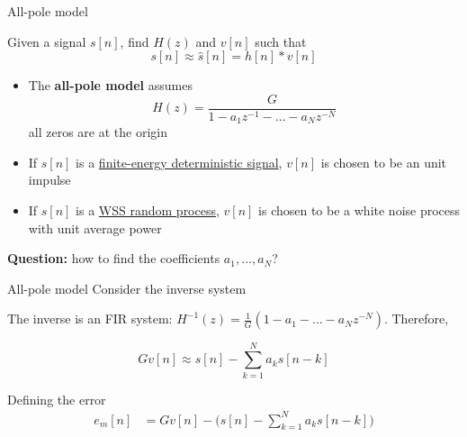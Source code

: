 \documentclass[10pt, aspectratio=169]{beamer}
\begin{document}
\begin{frame}{All-pole model}
	\begin{center}
	\resizebox{0.5\linewidth}{!}{}
	\end{center}
	
	Given a signal $s[n]$, find $H(z)$ and $v[n]$ such that 
	\begin{equation*}
		s[n] \approx \hat{s}[n] = h[n] \ast v[n]
	\end{equation*}
	
	\begin{itemize}
		\item The \textbf{all-pole model} assumes
		\begin{equation*}
			H(z) = \frac{G}{1 - a_1z^{-1} - \ldots - a_{N}z^{-N}}
		\end{equation*}
		all zeros are at the origin
		\item If $s[n]$ is a \underline{finite-energy deterministic signal}, $v[n]$ is chosen to be an unit impulse
		\item If $s[n]$ is a \underline{WSS random process}, $v[n]$ is chosen to be a white noise process with unit average power
	\end{itemize}

	\textbf{Question:} how to find the coefficients $a_1, \ldots, a_N$?
\end{frame}


\begin{frame}{All-pole model}
Consider the inverse system
\begin{center}
	\def\INVERSE{1}
	\resizebox{0.9\linewidth}{!}{}
\end{center}

The inverse is an FIR system: $H^{-1}(z) = \frac{1}{G}(1 - a_1 - \ldots - a_Nz^{-N})$. Therefore,

\begin{equation*}
Gv[n] \approx s[n] - \sum_{k = 1}^N a_ks[n-k]
\end{equation*}

Defining the error
\begin{align*}
e_m[n] &= Gv[n] - \Big(s[n] - \sum_{k = 1}^N a_ks[n-k]\Big) \tag{modeling error} \\
\end{align*}

\end{frame}
\end{document}
